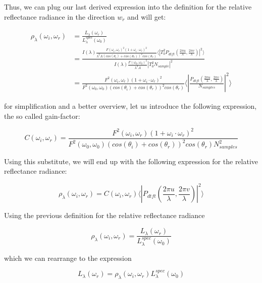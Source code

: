 Thus, we can plug our last derived expression into the definition for the relative reflectance radiance in the direction $w_r$ and will get:

\begin{align*}
\rho_\lambda(\omega_i,\omega_r)
& = \frac{L_\lambda(\omega_r)}{L_\lambda^{spec}(\omega_0)} \\
& = \frac{I(\lambda) \frac{F(\omega_i, \omega_r)^2 (1 + \omega_i \cdot \omega_r)^2}{\lambda^2 A (cos(\theta_i)+cos(\theta_r))^2 cos(\theta_r)} \langle \left|T_0^2 P_{dtft}(\frac{2\pi u}{\lambda}, \frac{2\pi v}{\lambda}) \right|^2\rangle}{I(\lambda) \frac{F(\omega_0, \omega_0)^2}{\lambda^2 A}\left| T_0^2 N_{sample} \right|^2 } \\
& = \frac{F^2(\omega_i,\omega_r)(1 + \omega_i \cdot \omega_r)^2}{F^2(\omega_0,\omega_0)(cos(\theta_i)+cos(\theta_r))^2 cos(\theta_r)} \langle \left|\frac{P_{dtft}(\frac{2\pi u}{\lambda}, \frac{2\pi v}{\lambda})}{N_{samples}}\right|^2\rangle
\end{align*}

for simplification and a better overview, let us introduce the following expression, the so called gain-factor:

\begin{equation} 
    C(\omega_i,\omega_r) = \frac{F^2(\omega_i,\omega_r)(1 + \omega_i \cdot \omega_r)^2}{F^2(\omega_0,\omega_0)(cos(\theta_i)+cos(\theta_r))^2 cos(\theta_r) N_{samples}^2}
\label{eq:cfact}
\end{equation}

Using this substitute, we will end up with the following expression for the relative reflectance radiance:

\begin{equation}
\rho_\lambda(\omega_i,\omega_r) =  C(\omega_i,\omega_r) \langle \left|P_{dtft}(\frac{2\pi u}{\lambda}, \frac{2\pi v}{\lambda})\right|^2\rangle
\label{eq:cpterm}
\end{equation}

Using the previous definition for the relative reflectance radiance 

\begin{equation}
 \rho_\lambda(\omega_i,\omega_r) = \frac{L_\lambda(\omega_r)}{L_\lambda^{spec}(\omega_0)} 
\end{equation}

which we can rearrange to the expression 

\begin{equation}
L_\lambda(\omega_r) = \rho_\lambda(\omega_i,\omega_r)L_\lambda^{spec}(\omega_0)
\end{equation}

